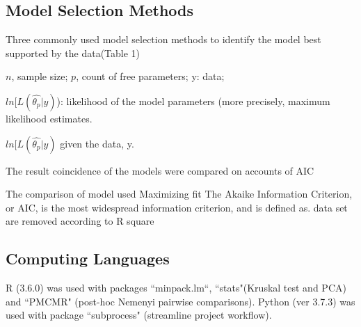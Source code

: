 \documentclass[a4paper,11pt]{article}
\theoremstyle{definition}
\begin{document}
\subsection{Model Selection Methods}
Three commonly used model selection methods to identify the model best supported by the data(Table 1)\\
\begin{center}
\begin{table}[]
\caption {Used commonly model selection methods}
\begin{threeparttable}
 \begin{tablenotes}
        \footnotesize
        \item[] $n$, sample size; $p$, count of free parameters; y: data; 
        \item[] $ln[L(\hat{\theta_p}|y)$): likelihood of the model parameters (more precisely, maximum likelihood estimates.
        \item[] $ln[L(\hat{\theta_p}|y)$ given the data, y. 
      \end{tablenotes}
    \end{threeparttable}
\end{table}
\end{center}

The result coincidence of the models were compared on accounts of AIC


The comparison of model used 
Maximizing fit
The Akaike Information Criterion, or AIC, is the most widespread information criterion, and is defined as.
data set are removed according to R square

\subsection{Computing Languages}
R (3.6.0) was used with packages ``minpack.lm“, ``stats"(Kruskal test and PCA) and ``PMCMR" (post-hoc Nemenyi pairwise comparisons).  Python (ver 3.7.3) was used with package ``subprocess" (streamline project workflow).
\end{document}

